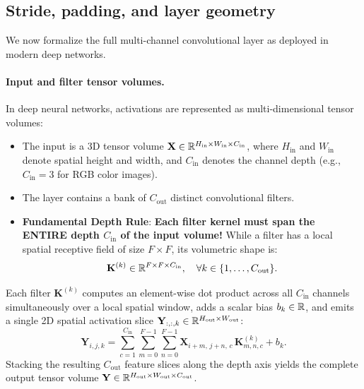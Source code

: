 \subsection{Stride, padding, and layer geometry}
\label{sec:conv_layer_anatomy}

We now formalize the full multi-channel convolutional layer as deployed in modern deep networks.

\paragraph{Input and filter tensor volumes.}
In deep neural networks, activations are represented as multi-dimensional tensor volumes:
\begin{itemize}[leftmargin=*]
  \item The input is a 3D tensor volume $\mathbf{X} \in \mathbb{R}^{H_{\text{in}} \times W_{\text{in}} \times C_{\text{in}}}$, where $H_{\text{in}}$ and $W_{\text{in}}$ denote spatial height and width, and $C_{\text{in}}$ denotes the channel depth (e.g., $C_{\text{in}} = 3$ for RGB color images).
  \item The layer contains a bank of $C_{\text{out}}$ distinct convolutional filters.
  \item \textbf{Fundamental Depth Rule}: \textbf{Each filter kernel must span the ENTIRE depth $C_{\text{in}}$ of the input volume!} While a filter has a local spatial receptive field of size $F \times F$, its volumetric shape is:
    \begin{equation}
    \mathbf{K}^{(k)} \in \mathbb{R}^{F \times F \times C_{\text{in}}}, \quad \forall k \in \{1, \dots, C_{\text{out}}\}.
    \end{equation}
\end{itemize}
Each filter $\mathbf{K}^{(k)}$ computes an element-wise dot product across all $C_{\text{in}}$ channels simultaneously over a local spatial window, adds a scalar bias $b_k \in \mathbb{R}$, and emits a single 2D spatial activation slice $\mathbf{Y}_{:,:,k} \in \mathbb{R}^{H_{\text{out}} \times W_{\text{out}}}$:
\begin{equation}
\mathbf{Y}_{i, j, k} = \sum_{c=1}^{C_{\text{in}}} \sum_{m=0}^{F-1} \sum_{n=0}^{F-1} \mathbf{X}_{i+m, \, j+n, \, c} \, \mathbf{K}^{(k)}_{m, n, c} + b_k.
\label{eq:multichannel_convolution}
\end{equation}
Stacking the resulting $C_{\text{out}}$ feature slices along the depth axis yields the complete output tensor volume $\mathbf{Y} \in \mathbb{R}^{H_{\text{out}} \times W_{\text{out}} \times C_{\text{out}}}$.

